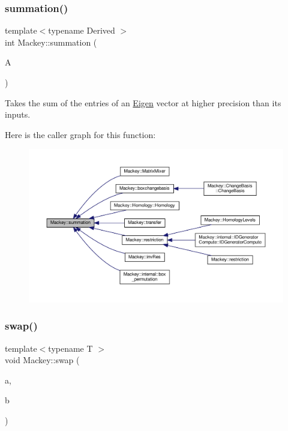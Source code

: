 \subsubsection{\texorpdfstring{summation()}{summation()}}
{\footnotesize\ttfamily template$<$typename Derived $>$ \\
int Mackey\+::summation (\begin{DoxyParamCaption}\item[{const Eigen\+::\+Matrix\+Base$<$ Derived $>$ \&}]{A }\end{DoxyParamCaption})}



Takes the sum of the entries of an \hyperlink{namespaceEigen}{Eigen} vector at higher precision than its inputs. 

Here is the caller graph for this function\+:\nopagebreak
\begin{figure}[H]
\begin{center}
\leavevmode
\includegraphics[width=350pt]{namespaceMackey_a359aa27a035d2b1f1a3f2f8270fc9e52_icgraph}
\end{center}
\end{figure}
\mbox{\label{namespaceMackey_aabed38680919594c4ba5eaa6730a7f82}} 
\subsubsection{\texorpdfstring{swap()}{swap()}}
{\footnotesize\ttfamily template$<$typename T $>$ \\
void Mackey\+::swap (\begin{DoxyParamCaption}\item[{T \&}]{a,  }\item[{T \&}]{b }\end{DoxyParamCaption})}

